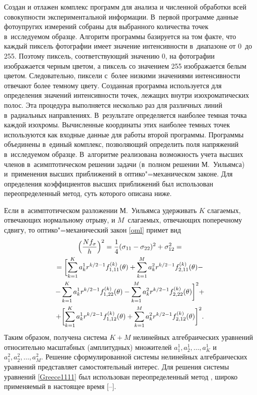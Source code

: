 Создан и отлажен комплекс программ для анализа и численной обработки всей совокупности экспериментальной информации. В~первой программе данные фотоупругих измерений собраны для выбранного количества точек в~исследуемом образце. Алгоритм программы базируется на том факте, что каждый пиксель фотографии имеет значение интенсивности в~диапазоне от 0~до 255. 
Поэтому пиксель, соответствующий значению 0, на фотографии изображается черным цветом, а пиксель со значением 255 изображается белым цветом. 
Следовательно, пиксели с~более низкими значениями интенсивности отвечают более темному цвету. 
Созданная программа используется для определения значений интенсивности точек, лежащих внутри изохроматических полос. 
Эта процедура выполняется несколько раз для различных линий в~радиальных направлениях. 
В~результате определяется наиболее темная точка каждой изохромы. 
Вычисленные координаты этих наиболее темных точек используются как входные данные для работы второй программы. Программы объединены в~единый комплекс, позволяющий определить поля напряжений в~исследуемом образце. 
В~алгоритме реализована возможность учета высших членов в~асимптотическом решении задачи (в~полном решении М.~Уильямса) и~применения высших приближений в оптико"=механическом законе. 
Для определения коэффициентов высших приближений был использован переопределенный метод, суть которого описана ниже.

Если в~асимптотическом разложении М.~Уильямса удерживать $K$ слагаемых, отвечающих нормальному отрыву, и $M$~слагаемых, отвечающих поперечному сдвигу, то оптико"=механический закон \eqref{oml} примет вид
\begin{multline}
\label{Greece1111}
\Bigl (\displaystyle\frac{Nf_{\sigma}}{h}\Bigr)^2=
\frac14(\sigma_{11}-\sigma_{22})^2+\sigma_{12}^2= \\
=\biggl[
\sum_{k=1}^{K}a_k^1r^{k/2-1}f_{1,11}^{(k)}(\theta)+\sum_{k=1}^{M}a_k^2r^{k/2-1}f_{2,11}^{(k)}(\theta)- 
\\
-
 \sum_{k=1}^{K}a_k^1r^{k/2-1}f_{1,22}^{(k)}(\theta)-\sum_{k=1}^{M}a_k^2r^{k/2-1}f_{2,22}^{(k)}(\theta)\biggr]^2+
\\
+\biggl[
\sum_{k=1}^{K}a_k^1r^{k/2-1}f_{1,12}^{(k)}(\theta)+\sum_{k=1}^{M}a_k^2r^{k/2-1}f_{2,12}^{(k)}(\theta)
\biggr]^2.
\end{multline}
Таким образом, получена система $K+M$ нелинейных алгебраических уравнений относительно масштабных  (амплитудных) множителей $a^1_1, a^1_2, \dots, a^1_K$ и $a^2_1, a^2_2,  \dots, a^2_M.$
Решение сформулированной системы нелинейных алгебраических уравнений представляет самостоятельный интерес. 
Для решения системы уравнений \eqref{Greece1111} был использован переопределенный метод \cite{ram1997}, широко применяемый в настоящее время [--].

